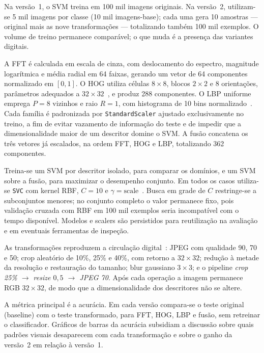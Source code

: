 \documentclass[12pt]{article}
\begin{document}
Na versão~1, o SVM treina em 100 mil imagens originais. Na versão~2, utilizam-se 5 mil imagens por classe (10 mil imagens-base); cada uma gera 10 amostras --- original mais as nove transformações --- totalizando também 100 mil exemplos. O volume de treino permanece comparável; o que muda é a presença das variantes digitais.

A FFT é calculada em escala de cinza, com deslocamento do espectro, magnitude logarítmica e média radial em 64 faixas, gerando um vetor de 64 componentes normalizado em $[0,1]$. O HOG utiliza células $8{\times}8$, blocos $2{\times}2$ e 8 orientações, parâmetros adequados a $32{\times}32$~\cite{dalal2005hog}, e produz 288 componentes. O LBP uniforme emprega $P=8$ vizinhos e raio $R=1$, com histograma de 10 bins normalizado~\cite{ojala2002lbp}. Cada família é padronizada por \texttt{StandardScaler} ajustado exclusivamente no treino, a fim de evitar vazamento de informação do teste e de impedir que a dimensionalidade maior de um descritor domine o SVM. A fusão concatena os três vetores já escalados, na ordem FFT, HOG e LBP, totalizando 362 componentes.

Treina-se um SVM por descritor isolado, para comparar os domínios, e um SVM sobre a fusão, para maximizar o desempenho conjunto. Em todos os casos utiliza-se \texttt{SVC} com kernel RBF, $C=10$ e $\gamma=\mathrm{scale}$~\cite{cortes1995svm}. Busca em grade de $C$ restringe-se a subconjuntos menores; no conjunto completo o valor permanece fixo, pois validação cruzada com RBF em 100 mil exemplos seria incompatível com o tempo disponível. Modelos e scalers são persistidos para reutilização na avaliação e em eventuais ferramentas de inspeção.

As transformações reproduzem a circulação digital~\cite{bammey2024synthbuster,choi2025warpad}: JPEG com qualidade 90, 70 e 50; crop aleatório de 10\%, 25\% e 40\%, com retorno a $32{\times}32$; redução à metade da resolução e restauração do tamanho; blur gaussiano $3{\times}3$; e o pipeline \emph{crop 25\% $\rightarrow$ resize $0{,}5$ $\rightarrow$ JPEG 70}. Após cada operação a imagem permanece RGB $32{\times}32$, de modo que a dimensionalidade dos descritores não se altere.

A métrica principal é a acurácia. Em cada versão compara-se o teste original (baseline) com o teste transformado, para FFT, HOG, LBP e fusão, sem retreinar o classificador. Gráficos de barras da acurácia subsidiam a discussão sobre quais padrões visuais desaparecem com cada transformação e sobre o ganho da versão~2 em relação à versão~1.
\end{document}
